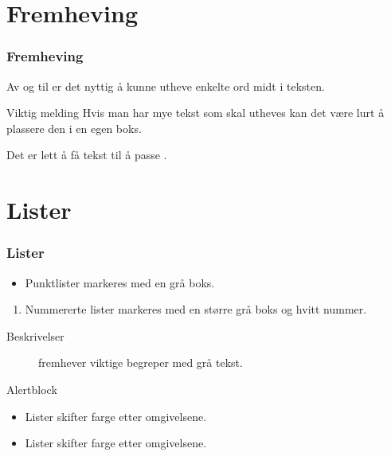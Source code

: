 \documentclass[norsk]{beamer}
\begin{document}
\section{Fremheving}


\begin{frame}
    \frametitle{Fremheving}

    Av og til er det nyttig å kunne \alert{utheve} enkelte ord midt i teksten.

    \begin{alertblock}{Viktig melding}
        Hvis man har mye tekst som skal \alert{utheves} kan det være lurt å plassere den i en egen boks.
    \end{alertblock}

    Det er lett å få tekst til å passe .
\end{frame}


\section{Lister}


\begin{frame}
    \frametitle{Lister}

    \begin{itemize}
        \item Punktlister markeres med en grå boks.
    \end{itemize}

    \begin{enumerate}
        \item Nummererte lister markeres med en større grå boks og hvitt nummer.
    \end{enumerate}

    \begin{description}
        \item[Beskrivelser] fremhever viktige begreper med grå tekst.
    \end{description}

    \begin{alertblock}{Alertblock}
        \begin{itemize}
            \item Lister skifter farge etter omgivelsene.
        \end{itemize}
    \end{alertblock}

    \begin{example}
        \begin{itemize}
            \item Lister skifter farge etter omgivelsene.
        \end{itemize}
    \end{example}
\end{frame}
\end{document}
